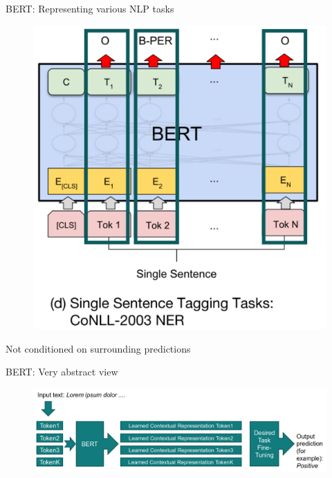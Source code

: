\documentclass[12pt,aspectratio=169,handout]{beamer}
\begin{document}
\begin{frame}{BERT: Representing various NLP tasks}
	
	\begin{figure}
		\includegraphics[width=0.5\linewidth]{img/task3.png}
	\end{figure}
	
	
	Not conditioned on surrounding predictions	
	
\end{frame}

\begin{frame}{BERT: Very abstract view}
	
	\begin{figure}
		\includegraphics[width=\linewidth]{img/bert1.png}
	\end{figure}	
	
\end{frame}
\end{document}
